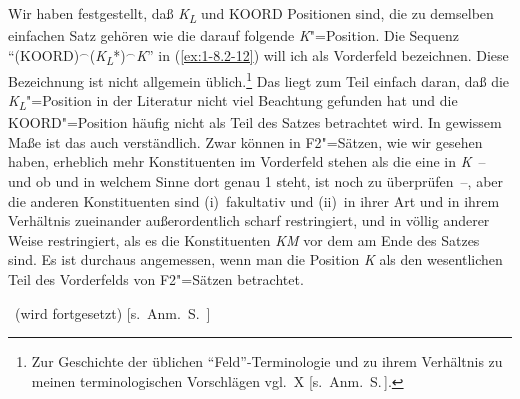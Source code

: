 \documentclass[output=paper]{langsci/langscibook}
\begin{document}
Wir haben festgestellt, daß \textit{K\textsubscript{L}} und KOORD
Positionen sind, die zu demselben einfachen Satz gehören wie die
darauf folgende \textit{K}"=Position. Die Sequenz "`(KOORD)$^{\smallfrown}$(\textit{K\textsubscript{L}}*)$^{\smallfrown}$\textit{K}"' in
(\ref{ex:1-8.2-12}) will ich als Vorderfeld bezeichnen. Diese Bezeichnung ist nicht allgemein
üblich.\footnote{\label{fn:1-39}%
  Zur Geschichte der üblichen "`Feld"'-Terminologie und zu ihrem Verhältnis zu meinen terminologischen
  Vorschlägen vgl.\ X [s.\ Anm.\ S.\,\pageref{fn-herausgeber-topo}].%
}
Das liegt zum Teil einfach daran, daß die \textit{K\textsubscript{L}}"=Position in der Literatur nicht viel Beachtung gefunden hat und die KOORD"=Position häufig nicht als Teil des Satzes betrachtet wird. In gewissem Maße ist das auch verständlich. Zwar können in F2"=Sätzen, wie wir gesehen
haben, erheblich mehr Konstituenten im Vorderfeld stehen als die eine
 in \textit{K}~-- und ob und in welchem Sinne dort genau 1
 steht, ist noch zu überprüfen~–, aber die anderen
Konstituenten sind (i)~fakultativ und (ii)~in ihrer Art und in ihrem
Verhältnis zueinander außerordentlich scharf restringiert, und in
völlig anderer Weise restringiert, als es die Konstituenten
\textit{KM} vor dem  am Ende des Satzes sind. Es ist durchaus
angemessen, wenn man die Position \textit{K} als den wesentlichen Teil
des Vorderfelds von F2"=Sätzen betrachtet.

\setcounter{footnote}{0}
\renewcommand*{\thefootnote}{YZ}

\vspace*{\baselineskip}
~\hfill (wird fortgesetzt) [s.\ Anm.\ S.\ \pageref{fn-herausgeber-topo}]


\sloppy
\printbibliography[heading=subbibliography,notkeyword=this]
\label{chap-topo-end}
\end{document}
